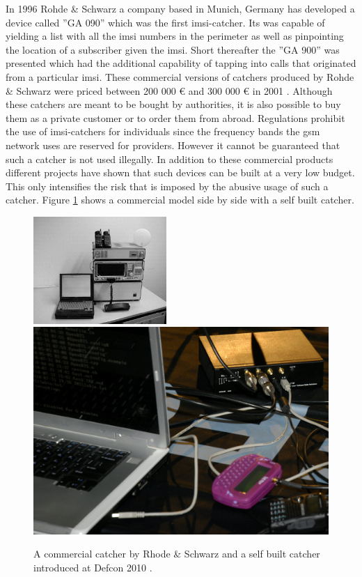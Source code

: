 In 1996 Rohde \& Schwarz a company based in Munich, Germany has developed a device called ''GA 090'' which was the first \gls{imsi}-catcher.
Its was capable of yielding a list with all the \gls{imsi} numbers in the perimeter as well as pinpointing the location of a subscriber given the \gls{imsi}.
Short thereafter the ''GA 900'' was presented which had the additional capability of tapping into calls that originated from a particular \gls{imsi}.
These commercial versions of catchers produced by Rohde \& Schwarz were priced between 200 000 \euro{} and 300 000 \euro{} in 2001 \cite{fox}.
Although these catchers are meant to be bought by authorities, it is also possible to buy them as a private customer or to order them from abroad.
Regulations prohibit the use of \gls{imsi}-catchers for individuals since the frequency bands the \gls{gsm} network uses are reserved for providers.
However it cannot be guaranteed that such a catcher is not used illegally.
In addition to these commercial products different projects \cite{dennis, def_catcher} have shown that such devices can be built at a very low budget.
This only intensifies the risk that is imposed by the abusive usage of such a catcher.
Figure \ref{fig:catchers} shows a commercial model side by side with a self built catcher.
\begin{figure}
\centering
\includegraphics[width=0.45\textwidth]{../Images/imsi_catcher}\hspace{1cm}\includegraphics[width=.45\textwidth]{../Images/usrp}
\caption{A commercial catcher by Rhode \& Schwarz \cite{fox} and a self built catcher introduced at Defcon 2010 \cite{def_catcher}.}
\label{fig:catchers}
\end{figure}

